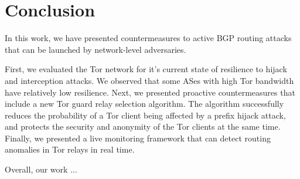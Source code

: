 \section{Conclusion}

In this work, we have presented countermeasures to active BGP routing attacks that can be launched by network-level adversaries. 

First, we evaluated the Tor network for it's current state of resilience to hijack and interception attacks.  
We observed that some ASes with high Tor bandwidth have relatively low resilience.  Next, we presented proactive countermeasures that include a new Tor guard relay selection algorithm. The algorithm successfully reduces the probability of a Tor client being affected by a prefix hijack attack, and protects the security and anonymity of the Tor clients at the same time. Finally, we presented a live monitoring framework that can detect routing anomalies in Tor relays in real time. 

Overall, our work ...

